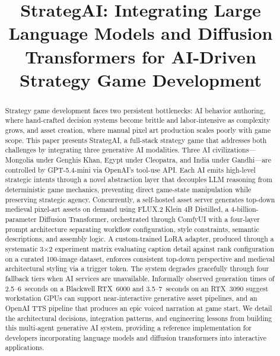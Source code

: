 \documentclass[conference]{IEEEtran}
\begin{document}
\title{StrategAI: Integrating Large Language Models and Diffusion Transformers
       for AI-Driven Strategy Game Development}

\author{
\and
{}
}

\maketitle

\begin{abstract}
Strategy game development faces two persistent bottlenecks: AI behavior
authoring, where hand-crafted decision systems become brittle and
labor-intensive as complexity grows, and asset creation, where manual pixel
art production scales poorly with game scope. This paper presents
StrategAI, a full-stack strategy game that addresses both challenges by
integrating three generative AI modalities. Three AI civilizations---Mongolia
under Genghis Khan, Egypt under Cleopatra, and India under Gandhi---are
controlled by GPT-5.4-mini via OpenAI's tool-use API. Each AI emits
high-level strategic intents through a novel abstraction layer that
decouples LLM reasoning from deterministic game mechanics, preventing
direct game-state manipulation while preserving strategic agency.
Concurrently, a self-hosted asset server generates top-down medieval
pixel-art assets on demand using FLUX.2 Klein 4B Distilled, a 4-billion-parameter
Diffusion Transformer, orchestrated through ComfyUI with a four-layer
prompt architecture separating workflow configuration, style constraints,
semantic descriptions, and assembly logic. A custom-trained LoRA adapter,
produced through a systematic 3$\times$2 experiment matrix evaluating
caption detail against rank configuration on a curated 100-image dataset,
enforces consistent top-down perspective and medieval architectural styling
via a trigger token. The system degrades gracefully through four fallback
tiers when AI services are unavailable. Informally observed generation times of 2.5--6~seconds
on a Blackwell RTX~6000 and 3.5--7~seconds on an RTX~3090 suggest
workstation GPUs can support near-interactive generative asset pipelines, and an OpenAI TTS pipeline that produces an epic voiced narration at game start.
We detail the architectural decisions, integration patterns, and
engineering lessons from building this multi-agent generative AI system,
providing a reference implementation for developers incorporating language
models and diffusion transformers into interactive applications.
\end{abstract}
\end{document}
